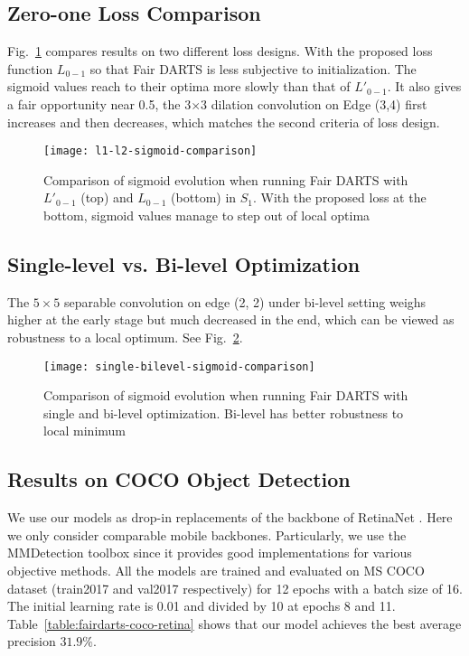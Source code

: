 \documentclass[runningheads]{llncs}
\begin{document}
\subsection{Zero-one Loss Comparison}
Fig.~\ref{fig:l1-l2-sigmoid-comparison} compares results on two different loss designs. With the proposed loss function $L_{0-1}$ so that Fair DARTS is less subjective to initialization. The sigmoid values reach to their optima more slowly than that of $L'_{0-1}$. It also gives a fair opportunity near 0.5,  the 3$\times$3 dilation convolution on Edge (3,4) first increases and then decreases, which matches the second criteria of loss design.


\begin{figure}[ht]
	\centering
	\texttt{[image: l1-l2-sigmoid-comparison]}
\caption{Comparison of sigmoid evolution when running Fair DARTS with $L'_{0-1}$ (top) and $L_{0-1}$ (bottom) in $S_1$. With the proposed loss at the bottom, sigmoid values manage to step out of local optima }
	\label{fig:l1-l2-sigmoid-comparison}
\end{figure}

\subsection{Single-level vs. Bi-level Optimization}
The $5\times5$ separable convolution on edge (2, 2) under bi-level setting weighs higher at the early stage but much decreased in the end, which can be viewed as robustness to a local optimum. See Fig.~\ref{fig:single-bilevel-sigmoid-comparison}. 


\begin{figure}[ht]
	\centering
	\texttt{[image: single-bilevel-sigmoid-comparison]}
\caption{Comparison of sigmoid evolution when running Fair DARTS with single and bi-level optimization. Bi-level has better robustness to local minimum}
	\label{fig:single-bilevel-sigmoid-comparison}
\end{figure}


\subsection{Results on COCO Object Detection}

We use our models as  drop-in replacements of the backbone of RetinaNet \cite{lin2017focal}. Here we only consider comparable mobile backbones. Particularly, we use the MMDetection \cite{chen2019mmdetection} toolbox since it provides good implementations for various objective methods.  All the models are trained and evaluated on MS COCO dataset (train2017 and val2017 respectively)  for 12 epochs with a batch size of 16. The initial learning rate is 0.01 and divided by 10 at epochs 8 and 11.  Table~\ref{table:fairdarts-coco-retina} shows that our model achieves the best average precision $31.9\%$. 
\end{document}
